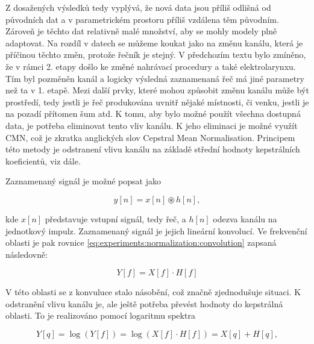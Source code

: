 
Z dosažených výsledků tedy vyplývá, že nová data jsou příliš odlišná od původních dat a v parametrickém prostoru příliš vzdálena těm původním. Zároveň je těchto dat relativně malé množství, aby se mohly modely plně adaptovat. Na rozdíl v datech se můžeme koukat jako na změnu kanálu, která je příčinou těchto změn, protože řečník je stejný. V předchozím textu bylo zmíněno, že v rámci 2. etapy došlo ke změné nahrávací procedury a také elektrolarynxu. Tím byl pozměněn kanál a logicky výsledná zaznamenaná řeč má jiné parametry než ta v 1. etapě. Mezi další prvky, které mohou způsobit změnu kanálu může být prostředí, tedy jestli je řeč produkována uvnitř nějaké místnosti, či venku, jestli je na pozadí přítomen šum atd. K tomu, aby bylo možné použít všechna dostupná data, je potřeba eliminovat tento vliv kanálu. K jeho eliminaci je možné využít CMN, což je zkratka anglických slov Cepstral Mean Normalisation. Principem této metody je odstranení vlivu kanálu na základě střední hodnoty kepstrálních koeficientů, viz dále.

Zaznamenaný signál je možné popsat jako

\begin{equation}
  y\left[n\right] = x\left[n\right] \circledast h\left[n\right],
  \label{eq:experiments:normalization:convolution}
\end{equation}

\noindent kde $x\left[n\right]$ představuje vstupní signál, tedy řeč, a $h\left[n\right]$ odezva kanálu na jednotkový impulz. Zaznamenaný signál je jejich lineární konvolucí. Ve frekvenční oblasti je pak rovnice \ref{eq:experiments:normalization:convolution} zapsaná následovně:

\begin{equation}
  Y\left[f\right] = X\left[f\right] \cdot H\left[f\right]
\end{equation}

\noindent V této oblasti se z konvuluce stalo násobění, což značně zjednodušuje situaci. K odstranění vlivu kanálu je, ale ještě potřeba převést hodnoty do kepstrálná oblasti. To je realizováno pomocí logaritmu spektra

\begin{equation}
  Y\left[q\right] = \log\left(Y\left[f\right]\right) = \log\left(X\left[f\right] \cdot H\left[f\right]\right) = X\left[q\right] + H\left[q\right],
\end{equation}

